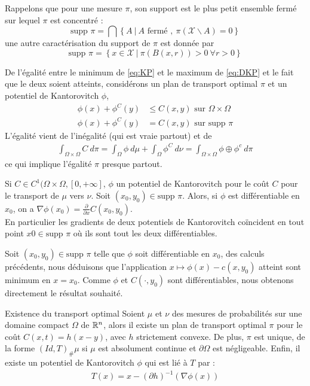 \documentclass[a4paper,12pt]{article}
\newcommand{\supp}{\text{supp }}
\begin{document}
Rappelons que pour une mesure $\pi$, son support est le plus petit ensemble fermé sur lequel $\pi$ est concentré : 
$$
\supp \pi = \bigcap \left\{A\ |\ A \text{ fermé },\ \pi(\mathcal{X}\backslash A) = 0 \right\}
$$
une autre caractérisation du support de $\pi$ est donnée par 
$$
\supp\pi = \left\{x\in\mathcal{X}\ |\ \pi(B(x,r)) >0\ \forall r>0\right\}
$$

De l'égalité entre le minimum de \eqref{eq:KP} et le maximum de \eqref{eq:DKP} et le fait que le deux soient atteints, considérons un plan de transport optimal $\pi$ et un potentiel de Kantorovitch $\phi$, 
\begin{align}
\phi(x)+\phi^C(y) &\leq C(x,y) \text{ sur } \Omega\times\Omega \\
\phi(x)+\phi^C(y) &= C(x,y) \text{ sur }\supp\pi
\end{align}
L'égalité vient de l'inégalité (qui est vraie partout) et de 
\begin{align}
\int_{\Omega\times\Omega} C\ d\pi = \int_{\Omega}\phi\ d\mu +  \int_{\Omega} \phi^C\ d\nu = \int_{\Omega\times\Omega} \phi\oplus\phi^c\ d\pi
\end{align}
ce qui implique l'égalité $\pi$ presque partout. 

\begin{proposition}
Si $C\in C^1(\Omega\times\Omega,[0,+\infty]$, $\phi$ un potentiel de Kantorovitch pour le coût $C$ pour le transport de $\mu$ vers $\nu$. Soit $(x_0,y_0)\in\supp\pi$. Alors, si $\phi$ est différentiable en $x_0$, on a $\nabla\phi(x_0)= \frac{\partial}{\partial x}C(x_0,y_0)$.\\
En particulier les gradients de deux potentiels de Kantorovitch coïncident en tout point $x0\in\supp\pi$ où ils sont tout les deux différentiables.
\end{proposition}
\begin{preuve}
Soit $(x_0,y_0)\in\supp\pi$ telle que $\phi$ soit différentiable en $x_0$, des calculs précédents, nous déduisons que l'application $x\mapsto\phi(x)-c(x,y_0)$ atteint sont minimum en $x=x_0$. 
Comme $\phi$ et $C(\cdot,y_0)$ sont différentiables, nous obtenons directement le résultat souhaité. 
\end{preuve}


\begin{theoreme}{Existence du transport optimal}
Soient $\mu$ et $\nu$ des mesures de probabilités sur une domaine compact $\Omega$ de $\mathbb{R}^n$, alors il existe un plan de transport optimal $\pi$ pour le coût $C(x,t) = h(x-y)$, avec $h$ strictement convexe. 
De plus, $\pi$ est unique, de la forme $(Id,T)_{\#}\mu$ si $\mu$ est absolument continue et $\partial\Omega$ est négligeable. Enfin, il existe un potentiel de Kantorovitch $\phi$ qui est lié à $T$ par :
\begin{align}
T(x) = x- (\partial h)^{-1}(\nabla\phi(x))
\end{align}
\end{theoreme}
\end{document}
